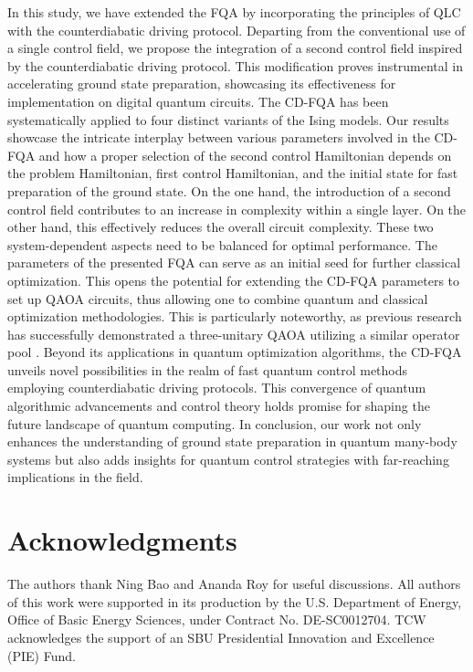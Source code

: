 \documentclass[twocolumn,aps,superscriptaddress,floatfix,longbibliography]{revtex4-2}
\newcommand{\raj}[1]{{\color[rgb]{1,0,1}{#1}}}
\begin{document}
In this study, we have extended the FQA by incorporating the
principles of QLC  with the counterdiabatic driving protocol.
Departing from the conventional use of a single control field,
we propose the integration of a second control field inspired by
the counterdiabatic driving protocol. This modification proves
instrumental in accelerating ground state preparation,
showcasing its effectiveness for implementation on digital
quantum circuits. The CD-FQA has been systematically applied to
four distinct variants of the Ising models. Our results showcase
the intricate interplay between various parameters involved in
the CD-FQA and how a proper selection of the second control
Hamiltonian depends on the problem Hamiltonian, first control
Hamiltonian, and the initial state for fast preparation of the
ground state. On the one hand, %
the introduction of a second
control field contributes to an increase in complexity within a
single layer. On the other hand, this %
effectively reduces the overall circuit complexity.  
These two system-dependent aspects need to be
balanced for optimal performance.
The parameters of the presented FQA can serve
as an initial seed for further classical optimization.
This opens the
potential for extending the CD-FQA parameters to set up QAOA
circuits, thus allowing one to combine %
quantum and classical
optimization methodologies. This is particularly noteworthy, as
previous research has successfully demonstrated a three-unitary
QAOA utilizing a similar operator pool
\cite{chandarana2022digitized}. Beyond its applications in
quantum optimization algorithms, the CD-FQA unveils novel
possibilities in the realm of fast quantum control methods
employing counterdiabatic driving protocols. This convergence of
quantum algorithmic advancements and control theory holds
promise for shaping the future landscape of quantum computing.
In conclusion, our work not only enhances the understanding of
ground state preparation in quantum many-body systems but also
adds insights for quantum control strategies with far-reaching
implications in the field.

\section{Acknowledgments}

The authors thank Ning Bao and Ananda Roy for useful discussions. All authors of this work were supported in its production by the U.S. Department of Energy, Office of Basic Energy Sciences, under Contract No. DE-SC0012704.
TCW acknowledges the support of an SBU Presidential Innovation and Excellence (PIE)
Fund.
\end{document}
